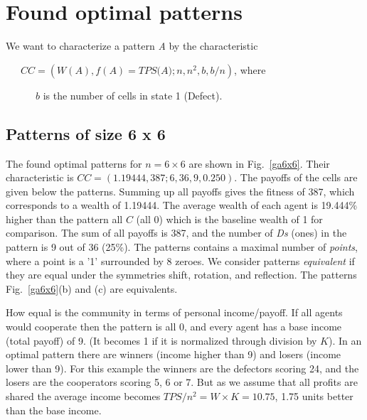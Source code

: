\documentclass[10pt,a4paper]{article}  %
\begin{document}
\section{Found optimal patterns}

We want to characterize a pattern \textit{A} by the characteristic 

~~~$CC=(W(A), f(A)=\textit{TPS(A)}; n, n^2, b, b/n)$, where

~~~~~~$b$ is the number of cells in state 1 (Defect).

\subsection{Patterns of size 6 x 6}

The found optimal patterns for $n =6 \times 6$ are shown in Fig.~\ref{ga6x6}.
Their characteristic is 
$CC=(1.19444, 387; 6, 36, 9, 0.250)$. 
The payoffs of the cells are given below the patterns.
Summing up all payoffs gives the fitness of 387, which corresponds
to a wealth of 1.19444.
%
The average wealth of each agent is 19.444\% higher than the pattern all $C$ (all 0) which 
is the baseline wealth of 1 for comparison.
The sum of all payoffs is 387, and the number of \textit{Ds} (ones) in the pattern is 9 out of 36 (25\%).
The patterns contains a maximal number of \textit{points}, 
where a point is a '1' surrounded by 8 zeroes. 
We consider patterns \textit{equivalent} if they are equal under the symmetries shift, rotation,
and reflection.
The patterns Fig.~\ref{ga6x6}(b) and (c) are equivalents.

How equal is the community in terms of personal income/payoff.
If all agents would cooperate then the pattern is all 0, 
and every agent has a base income (total payoff) of 9.
(It becomes 1 if it is normalized through division by $K$).
In an optimal pattern there are winners (income higher than 9) and losers (income lower than 9).
For this example the winners are the defectors scoring 24, and the losers are the
cooperators scoring 5, 6 or 7. But as we assume that all profits are shared
the average income  becomes $TPS/n^2= W\times K = 10.75$, 1.75 units better than 
the base income. 
\end{document}

